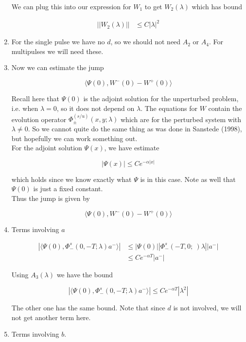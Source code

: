 \documentclass[12pt]{article}
\begin{document}
\begin{enumerate}
We can plug this into our expression for $W_1$ to get $W_2(\lambda)$ which has bound

\begin{align*}
||W_2(\lambda)|| &\leq C |\lambda|^2
\end{align*}

\item For the single pulse we have no $d$, so we should not need $A_2$ or $A_4$. For multipulses we will need these.

\item Now we can estimate the jump

\[
\langle \Psi(0), W^-(0) - W^+(0) \rangle 
\]

Recall here that $\Psi(0)$ is the adjoint solution for the unperturbed problem, i.e. when $\lambda = 0$, so it does not depend on $\lambda$. The equations for $W$ contain the evolution operator $\Phi^{(s/u)}_\pm(x, y; \lambda)$ which are for the perturbed system with $\lambda \neq 0$. So we cannot quite do the same thing as was done in Sanstede (1998), but hopefully we can work something out.\\

For the adjoint solution $\Psi(x)$, we have estimate 

\[
|\Psi(x)| \leq C e^{-\alpha|x|}
\]

which holds since we know exactly what $\Psi$ is in this case. Note as well that $\Psi(0)$ is just a fixed constant.\\

Thus the jump is given by

\[
\langle \Psi(0), W^-(0) - W^+(0) \rangle 
\]

\item Terms involving $a$

\begin{align*}
|\langle \Psi(0), \Phi^s_-(0, -T; \lambda )a^- \rangle| &\leq |\Psi(0)||\Phi^s_-(-T, 0; \
)\lambda||a^-| \\
&\leq C e^{-\alpha T} |a^-|
\end{align*}

Using $A_3(\lambda)$ we have the bound

\[
|\langle \Psi(0), \Phi^s_-(0, -T; \lambda )a^- \rangle| \leq C  e^{-\alpha T} |\lambda^2|
\]

The other one has the same bound. Note that since $d$ is not involved, we will not get another term here.

\item Terms involving $b$.\\


\end{enumerate}
\end{document}
